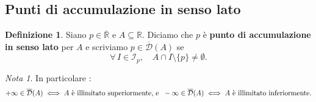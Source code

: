 \documentclass{article}
\theoremstyle{plain}
\theoremstyle{definition}
\newtheorem{defn}{Definizione}[section]
\theoremstyle{remark}
\newtheorem{note}{Nota}
\begin{document}
\vspace{10pt}

\subsection{Punti di accumulazione in senso lato}

\vspace{10pt}

\begin{bxthm}
\begin{defn}
    Siano $p\in\overline{\mathbb{R}}$ e $A\subseteq\mathbb{R}$.
    Diciamo che $p$ è \textbf{punto di accumulazione in senso lato} per $A$ e scriviamo 
    $p\in\overline{\mathcal{D}}(A)$ se 
    \[\forall\, I\in \mathcal{I}_p,\quad A\cap I\setminus\{p\}\neq\emptyset.\]
\end{defn}
\end{bxthm}

\vspace{10pt}

\begin{note}
    In particolare :
    \[+\infty\in\overline{\mathcal{D}}(A)\iff A\textup{ è illimitato superiormente, e }\;-\infty\in\overline{\mathcal{D}}(A)\iff A\textup{ è illimitato inferiormente}.\]
\end{note}

\vspace{10pt}
\end{document}

